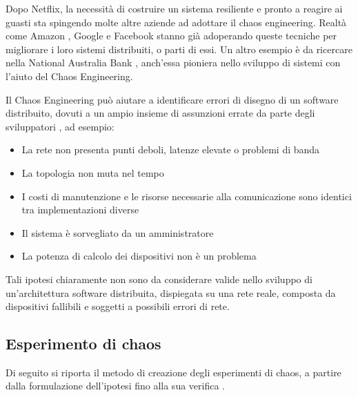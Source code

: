     Dopo Netflix, la necessità di costruire un sistema resiliente e pronto a reagire ai guasti sta spingendo molte altre aziende ad adottare il chaos engineering. Realtà come Amazon \cite{amazon}, Google \cite{Google} e Facebook \cite{Facebook} stanno già adoperando queste tecniche per migliorare i loro sistemi distribuiti, o parti di essi.
    Un altro esempio è da ricercare nella National Australia Bank \cite{NAB}, anch’essa pioniera nello sviluppo di sistemi con l'aiuto del Chaos Engineering. 
    
    
    Il Chaos Engineering può aiutare a identificare errori di disegno di un software distribuito, dovuti a un ampio insieme di assunzioni errate da parte degli sviluppatori \cite{miles}, ad esempio:
    \begin{itemize}
        \item La rete non presenta punti deboli, latenze elevate o problemi di banda
        
        \item La topologia non muta nel tempo
        
        \item I costi di manutenzione e le risorse necessarie alla comunicazione sono identici tra implementazioni diverse 
        
        \item Il sistema è sorvegliato da un amministratore 
        
        \item La potenza di calcolo dei dispositivi non è un problema 
    \end{itemize}
    Tali ipotesi chiaramente non sono da considerare valide nello sviluppo di un’architettura software distribuita, dispiegata su una rete reale, composta da dispositivi fallibili e soggetti a possibili errori di rete.
        \subsection{Esperimento di chaos}Di seguito si riporta il metodo di creazione degli esperimenti di chaos, a partire dalla formulazione dell’ipotesi fino alla sua verifica \cite{miles}\cite{jones} .
        
